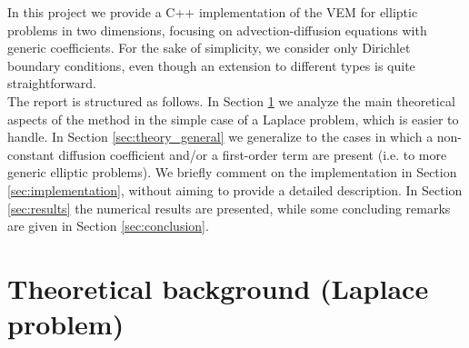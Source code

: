 \documentclass[10pt]{article}
\begin{document}
In this project we provide a C++ implementation of the VEM for elliptic problems in two dimensions, focusing on advection-diffusion equations with generic coefficients. For the sake of simplicity, we consider only Dirichlet boundary conditions, even though an extension to different types is quite straightforward. \\
The report is structured as follows. In Section \ref{sec:theory_Laplace} we analyze the main theoretical aspects of the method in the simple case of a Laplace problem, which is easier to handle. In Section \ref{sec:theory_general} we generalize to the cases in which a non-constant diffusion coefficient and/or a first-order term are present (i.e. to more generic elliptic problems). We briefly comment on the implementation in Section \ref{sec:implementation}, without aiming to provide a detailed description.
In Section \ref{sec:results} the numerical results are presented, while some concluding remarks are given in Section \ref{sec:conclusion}.

\newpage

\section{Theoretical background (Laplace problem)} \label{sec:theory_Laplace}
\end{document}
